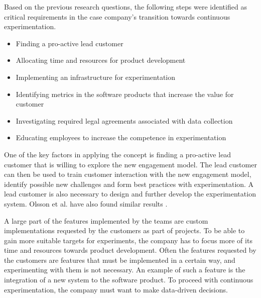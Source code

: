 \documentclass[english, grading]{tktltiki2}
\theoremstyle{definition}
\theoremstyle{remark}
\begin{document}
Based on the previous research questions, the following steps were identified as critical requirements in the case company's transition towards continuous experimentation.

\begin{itemize}
\item Finding a pro-active lead customer
\item Allocating time and resources for product development
\item Implementing an infrastructure for experimentation
\item Identifying metrics in the software products that increase the value for customer
\item Investigating required legal agreements associated with data collection
\item Educating employees to increase the competence in experimentation
\end{itemize}



One of the key factors in applying the concept is finding a pro-active lead customer that is willing to explore the new engagement model. The lead customer can then be used to train customer interaction with the new engagement model, identify possible new challenges and form best practices with experimentation. A lead customer is also necessary to design and further develop the experimentation system. Olsson et al. have also found similar results \cite{olsson2012climbing}.

A large part of the features implemented by the teams are custom implementations requested by the customers as part of projects. To be able to gain more suitable targets for experiments, the company has to focus more of its time and resources towards product development. Often the features requested by the customers are features that must be implemented in a certain way, and experimenting with them is not necessary. An example of such a feature is the integration of a new system to the software product. To proceed with continuous experimentation, the company must want to make data-driven decisions.
\end{document}
